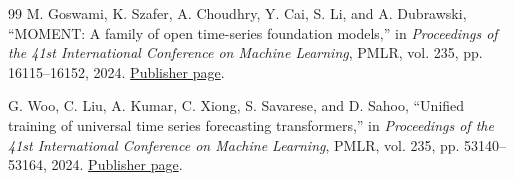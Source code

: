 \begin{thebibliography}{99}
M. Goswami, K. Szafer, A. Choudhry, Y. Cai, S. Li, and A. Dubrawski, ``MOMENT: A family of open time-series foundation models,'' in \emph{Proceedings of the 41st International Conference on Machine Learning}, PMLR, vol. 235, pp. 16115--16152, 2024. \href{https://proceedings.mlr.press/v235/goswami24a.html}{Publisher page}.

G. Woo, C. Liu, A. Kumar, C. Xiong, S. Savarese, and D. Sahoo, ``Unified training of universal time series forecasting transformers,'' in \emph{Proceedings of the 41st International Conference on Machine Learning}, PMLR, vol. 235, pp. 53140--53164, 2024. \href{https://proceedings.mlr.press/v235/woo24a.html}{Publisher page}.

\end{thebibliography}
